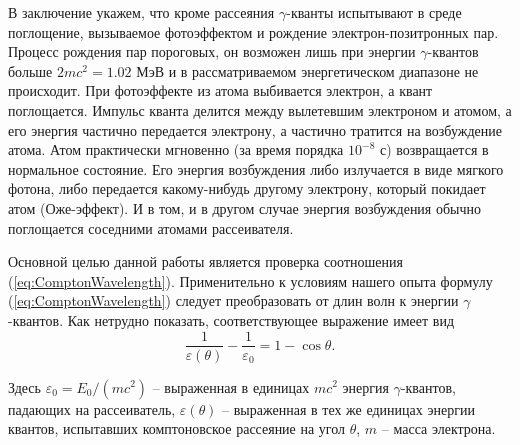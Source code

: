 \documentclass[a4paper, 12pt]{article}
\begin{document}
В заключение укажем, что кроме рассеяния $\gamma$-кванты испытывают в среде поглощение, вызываемое фотоэффектом и рождение электрон-позитронных пар. Процесс рождения пар пороговых, он возможен лишь при энергии $\gamma$-квантов больше $2mc^2=1.02$ МэВ и в рассматриваемом энергетическом диапазоне не происходит. При фотоэффекте из атома выбивается электрон, а квант поглощается. Импульс кванта делится между вылетевшим электроном и атомом, а его энергия частично передается электрону, а частично тратится на возбуждение атома. Атом практически мгновенно (за время порядка $10^{-8}$ с) возвращается в нормальное состояние. Его энергия возбуждения либо излучается в виде мягкого фотона, либо передается какому-нибудь другому электрону, который покидает атом (Оже-эффект). И в том, и в другом случае энергия возбуждения обычно поглощается соседними атомами рассеивателя.\par
Основной целью данной работы является проверка соотношения (\ref{eq:ComptonWavelength}). Применительно к условиям нашего опыта формулу (\ref{eq:ComptonWavelength}) следует преобразовать от длин волн к энергии $\gamma$-квантов. Как нетрудно показать, соответствующее выражение имеет вид
\begin{equation}
	\frac{1}{\varepsilon(\theta)}-\frac{1}{\varepsilon_0}=1-\cos\theta.
	\label{eq2}
\end{equation}
\par
Здесь $\varepsilon_0=E_0/\left(mc^2\right)$ -- выраженная в единицах $mc^2$ энергия $\gamma$-квантов, падающих на рассеиватель, $\varepsilon(\theta)$ -- выраженная в тех же единицах энергии квантов, испытавших комптоновское рассеяние на угол $\theta$, $m$ -- масса электрона.
\end{document}
